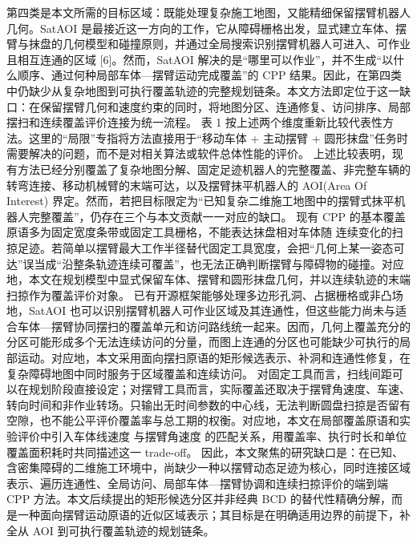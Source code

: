 {}第四类是本文所需的目标区域：既能处理复杂施工地图，又能精细保留摆臂机器人几何。SatAOI 是最接近这一方向的工作，它从障碍栅格出发，显式建立车体、摆臂与抹盘的几何模型和碰撞原则，并通过全局搜索识别摆臂机器人可进入、可作业且相互连通的区域 [6]。然而，SatAOI 解决的是“哪里可以作业”，并不生成“以什么顺序、通过何种局部车体—摆臂运动完成覆盖”的 CPP 结果。因此，在第四类中仍缺少从复杂地图到可执行覆盖轨迹的完整规划链条。本文方法即定位于这一缺口：在保留摆臂几何和速度约束的同时，将地图分区、连通修复、访问排序、局部摆扫和连续覆盖评价连接为统一流程。\markdownRendererParagraphSeparator
{}表 1 按上述两个维度重新比较代表性方法。这里的“局限”专指将方法直接用于“移动车体 + 主动摆臂 + 圆形抹盘”任务时需要解决的问题，而不是对相关算法或软件总体性能的评价。\markdownRendererParagraphSeparator
{}\markdownRendererParagraphSeparator
{}\markdownRendererSectionBegin
{}\markdownRendererParagraphSeparator
{}上述比较表明，现有方法已经分别覆盖了复杂地图分解、固定足迹机器人的完整覆盖、非完整车辆的转弯连接、移动机械臂的末端可达，以及摆臂抹平机器人的 AOI(Area Of Interest) 界定。然而，若把目标限定为“已知复杂二维施工地图中的摆臂式抹平机器人完整覆盖”，仍存在三个与本文贡献一一对应的缺口。\markdownRendererParagraphSeparator
{} 现有 CPP 的基本覆盖原语多为固定宽度条带或固定工具栅格，不能表达抹盘相对车体随 \markdownRendererInlineMath{\phi} 连续变化的扫掠足迹。若简单以摆臂最大工作半径替代固定工具宽度，会把“几何上某一姿态可达”误当成“沿整条轨迹连续可覆盖”，也无法正确判断摆臂与障碍物的碰撞。对应地，本文在规划模型中显式保留车体、摆臂和圆形抹盘几何，并以连续轨迹的末端扫掠作为覆盖评价对象。\markdownRendererParagraphSeparator
{} 已有开源框架能够处理多边形孔洞、占据栅格或非凸场地，SatAOI 也可以识别摆臂机器人可作业区域及其连通性，但这些能力尚未与适合车体—摆臂协同摆扫的覆盖单元和访问路线统一起来。因而，几何上覆盖充分的分区可能形成多个无法连续访问的分量，而图上连通的分区也可能缺少可执行的局部运动。对应地，本文采用面向摆扫原语的矩形候选表示、补洞和连通性修复，在复杂障碍地图中同时服务于区域覆盖和连续访问。\markdownRendererParagraphSeparator
{} 对固定工具而言，扫线间距可以在规划阶段直接设定；对摆臂工具而言，实际覆盖还取决于摆臂角速度、车速、转向时间和非作业转场。只输出无时间参数的中心线，无法判断圆盘扫掠是否留有空隙，也不能公平评价覆盖率与总工期的权衡。对应地，本文在局部覆盖原语和实验评价中引入车体线速度  与摆臂角速度  的匹配关系，用覆盖率、执行时长和单位覆盖面积耗时共同描述这一 trade-off。\markdownRendererParagraphSeparator
{}因此，本文聚焦的研究缺口是：在已知、含密集障碍的二维施工环境中，尚缺少一种以摆臂动态足迹为核心，同时连接区域表示、遍历连通性、全局访问、局部车体—摆臂协调和连续扫掠评价的端到端 CPP 方法。本文后续提出的矩形候选分区并非经典 BCD 的替代性精确分解，而是一种面向摆臂运动原语的近似区域表示；其目标是在明确适用边界的前提下，补全从 AOI 到可执行覆盖轨迹的规划链条。
\markdownRendererSectionEnd 
\markdownRendererSectionEnd 
\markdownRendererSectionEnd \markdownRendererDocumentEnd